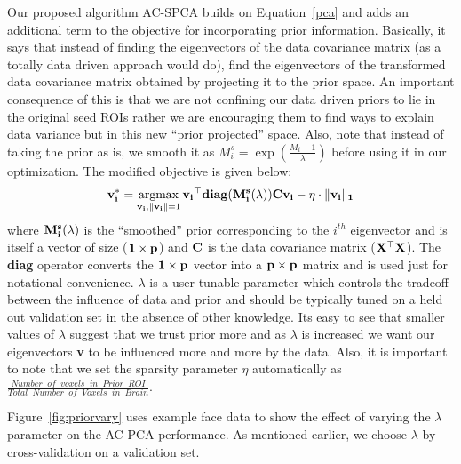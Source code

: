 \documentclass{llncs}
\newcommand{\argmax}{\operatornamewithlimits{argmax}}
\begin{document}
Our proposed algorithm AC-SPCA builds on Equation~\ref{pca} and adds an additional term to the objective for incorporating prior information. Basically, it says that instead of finding the eigenvectors of the data covariance matrix (as a totally data driven approach would do), find the eigenvectors of the transformed data covariance matrix obtained by projecting it to the prior space. An important consequence of this is that we are not confining our data driven priors to lie in the original seed ROIs rather we are encouraging them to find ways to explain data variance but in this new ``prior projected'' space.  Also, note that instead of taking the prior as is, we smooth it as $M^s_i=\exp(\frac{M_i-1}{\lambda})$ before using it in our optimization. The modified objective is given below:
\begin{equation}
\label{ppca}
{\bf v_i^*}= \argmax_{{\bf v_i},{\bf \|v_i\|}=1} {\bf v_i}^{\top}{\bf diag(M^s_i(\lambda))}{\bf C}{\bf v_i} - \eta\cdot\|\bf v_i \|_1
\end{equation}
where ${\bf M^s_i(\lambda)}$ is  the ``smoothed'' prior corresponding to the $i^{th}$ eigenvector and is itself a vector of size (${\bf 1\times p}$) and $\bf C$ is the data covariance matrix ($\bf X^{\top}X$). The {\bf diag} operator converts the ${\bf 1\times p}$ vector into a ${\bf p\times p}$ matrix and is used just for notational convenience.  $\lambda$ is a user tunable parameter which controls the tradeoff between the influence of data and prior and should be typically tuned on a held out validation set in the absence of other knowledge. Its easy to see that smaller values of $\lambda$ suggest that we trust prior more and as $\lambda$ is increased we want our eigenvectors {\bf v} to be influenced more and more by the data. Also, it is important to note that we set the sparsity parameter $\eta$ automatically as $\frac{Number\;\;of\;\;voxels\;\;in\;\;Prior\;\;ROI}{Total\;\;Number\;\;of\;\;Voxels\;\;in\;\;Brain}$. 

Figure~\ref{fig:priorvary} uses example face data to show the effect of varying the $\lambda$  parameter on the AC-PCA performance. As mentioned earlier, we choose $\lambda$ by cross-validation on a validation set.

\end{document}
